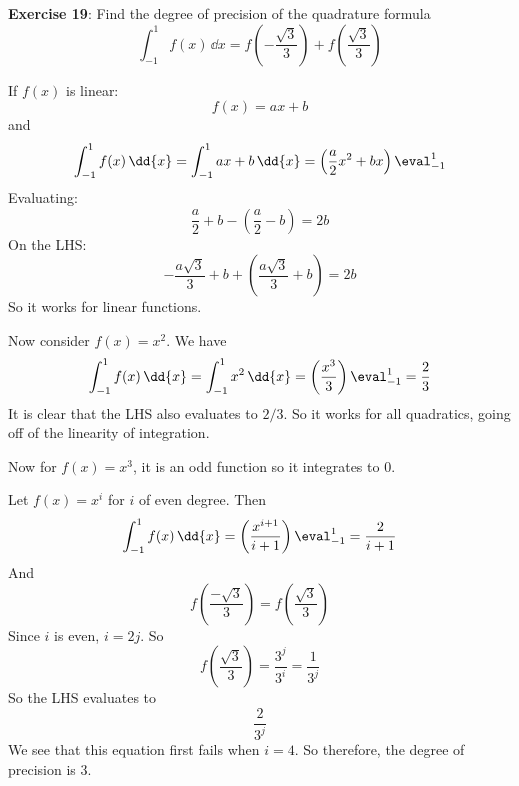 \documentclass{article}
\begin{document}
\textbf{Exercise 19}: Find the degree of precision of the quadrature formula
    \begin{equation*}
        \int_{-1}^{1} f(x) \, \dd{x} = f\left(-\dfrac{\sqrt{3}}{3}\right) + f\left(\dfrac{\sqrt{3}}{3}\right)
    \end{equation*}
    \begin{answer}
        If $f(x)$ is linear:
            \begin{equation*}
                f(x) = ax + b
            \end{equation*}
        and 
            \begin{equation*}
                \int_{-1}^{1} f(x) \, \dd{x} = \int_{-1}^{1} ax + b \, \dd{x} = \left(\dfrac{a}{2}x^{2} + bx\right) \eval_{-1}^{1}
            \end{equation*}
        Evaluating:
            \begin{equation*}
                \dfrac{a}{2} + b - (\dfrac{a}{2} - b) = 2b
            \end{equation*}
        On the LHS:
            \begin{equation*}
                -\dfrac{a\sqrt{3}}{3} + b + (\dfrac{a\sqrt{3}}{3} + b) = 2b
            \end{equation*}
        So it works for linear functions.

        Now consider $f(x) = x^{2}$. We have
            \begin{equation*}
                \int_{-1}^{1} f(x) \, \dd{x} = \int_{-1}^{1} x^{2} \, \dd{x} = \left(\dfrac{x^{3}}{3}\right)\eval_{-1}^{1} = \dfrac{2}{3}
            \end{equation*}
        It is clear that the LHS also evaluates to $2/3$. So it works for all quadratics, going off of the linearity of integration. 

        Now for $f(x) = x^{3}$, it is an odd function so it integrates to $0$.

        Let $f(x) = x^{i}$ for $i$ of even degree. Then
            \begin{equation*}
                \int_{-1}^{1} f(x) \, \dd{x} = \left(\dfrac{x^{i + 1}}{i + 1}\right)\eval_{-1}^{1} = \dfrac{2}{i + 1}
            \end{equation*}
        And
            \begin{equation*}
                f\left(\dfrac{-\sqrt{3}}{3}\right) = f\left(\dfrac{\sqrt{3}}{3}\right)
            \end{equation*}
        Since $i$ is even, $i = 2j$. So
            \begin{equation*}
                f\left(\dfrac{\sqrt{3}}{3}\right) = \dfrac{3^{j}}{3^{i}} = \dfrac{1}{3^{j}}
            \end{equation*}
        So the LHS evaluates to 
            \begin{equation*}
                \dfrac{2}{3^{j}}
            \end{equation*}
        We see that this equation first fails when $i = 4$. So therefore, the degree of precision is $3$.
    \end{answer}
\end{document}
